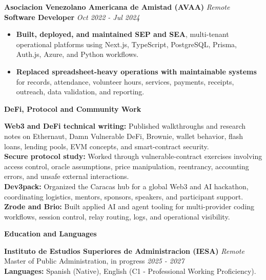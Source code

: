 \documentclass[10pt]{article}
\newcommand{\sectiontitle}[1]{%
    \vspace{3pt}
    \begin{center}
        \textbf{#1}
    \end{center}
    \vspace{-5pt}
}
\begin{document}
\vspace{1pt}
\textbf{Asociacion Venezolano Americana de Amistad (AVAA)} \hfill \textit{Remote} \\
\textbf{Software Developer} \hfill \textit{Oct 2022 - Jul 2024}
\begin{itemize}
    \item \textbf{Built, deployed, and maintained SEP and SEA}, multi-tenant operational platforms using Next.js, TypeScript, PostgreSQL, Prisma, Auth.js, Azure, and Python workflows.
    \item \textbf{Replaced spreadsheet-heavy operations with maintainable systems} for records, attendance, volunteer hours, services, payments, receipts, outreach, data validation, and reporting.
\end{itemize}

\sectiontitle{DeFi, Protocol and Community Work}
\textbf{Web3 and DeFi technical writing:} Published walkthroughs and research notes on Ethernaut, Damn Vulnerable DeFi, Brownie, wallet behavior, flash loans, lending pools, EVM concepts, and smart-contract security. \\
\textbf{Secure protocol study:} Worked through vulnerable-contract exercises involving access control, oracle assumptions, price manipulation, reentrancy, accounting errors, and unsafe external interactions. \\
\textbf{Dev3pack:} Organized the Caracas hub for a global Web3 and AI hackathon, coordinating logistics, mentors, sponsors, speakers, and participant support. \\
\textbf{Zrode and Brio:} Built applied AI and agent tooling for multi-provider coding workflows, session control, relay routing, logs, and operational visibility.

\sectiontitle{Education and Languages}
\textbf{Instituto de Estudios Superiores de Administracion (IESA)} \hfill \textit{Remote} \\
Master of Public Administration, in progress \hfill \textit{2025 - 2027} \\
\textbf{Languages:} Spanish (Native), English (C1 - Professional Working Proficiency).
\end{document}
